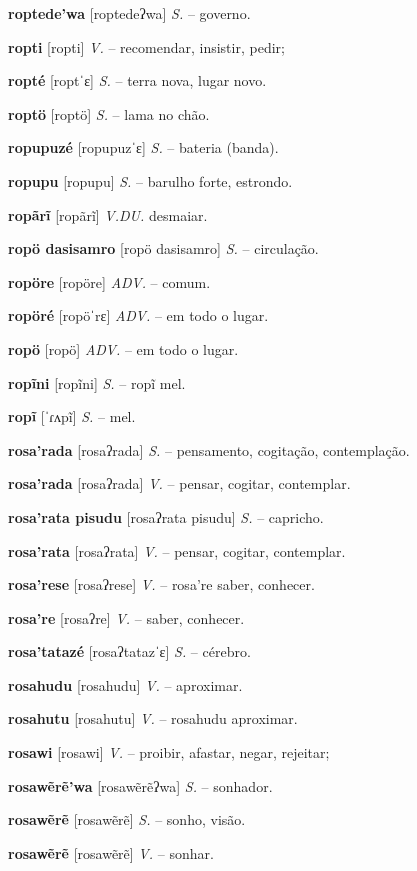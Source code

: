 \textbf{roptede'wa} [roptedeʔwa] \textit{S.} -- governo.

\textbf{ropti} [ropti] \textit{V.} -- recomendar, insistir, pedir;

\textbf{ropté} [roptˈɛ] \textit{S.} -- terra nova, lugar novo.

\textbf{roptö} [roptö] \textit{S.} -- lama no chão.

\textbf{ropupuzé} [ropupuzˈɛ] \textit{S.} -- bateria (banda).

\textbf{ropupu} [ropupu] \textit{S.} -- barulho forte, estrondo.

\textbf{ropãrĩ} [ropãrĩ] \textit{V.DU.} desmaiar.

\textbf{ropö dasisamro} [ropö dasisamro] \textit{S.} -- circulação.

\textbf{ropöre} [ropöre] \textit{ADV.} -- comum.

\textbf{ropöré} [ropöˈrɛ] \textit{ADV.} -- em todo o lugar.

\textbf{ropö} [ropö] \textit{ADV.} -- em todo o lugar.

\textbf{ropĩni} [ropĩni] \textit{S.} -- ropĩ mel.

\textbf{ropĩ} [ˈɾʌpĩ] \textit{S.} -- mel.

\textbf{rosa'rada} [rosaʔrada] \textit{S.} -- pensamento, cogitação, contemplação.

\textbf{rosa'rada} [rosaʔrada] \textit{V.} -- pensar, cogitar, contemplar.

\textbf{rosa'rata pisudu} [rosaʔrata pisudu] \textit{S.} -- capricho.

\textbf{rosa'rata} [rosaʔrata] \textit{V.} -- pensar, cogitar, contemplar.

\textbf{rosa'rese} [rosaʔrese] \textit{V.} -- rosa're saber, conhecer.

\textbf{rosa're} [rosaʔre] \textit{V.} -- saber, conhecer.

\textbf{rosa'tatazé} [rosaʔtatazˈɛ] \textit{S.} -- cérebro.

\textbf{rosahudu} [rosahudu] \textit{V.} -- aproximar.

\textbf{rosahutu} [rosahutu] \textit{V.} -- rosahudu aproximar.

\textbf{rosawi} [rosawi] \textit{V.} -- proibir, afastar, negar, rejeitar;

\textbf{rosawẽrẽ'wa} [rosawẽrẽʔwa] \textit{S.} -- sonhador.

\textbf{rosawẽrẽ} [rosawẽrẽ] \textit{S.} -- sonho, visão.

\textbf{rosawẽrẽ} [rosawẽrẽ] \textit{V.} -- sonhar.

